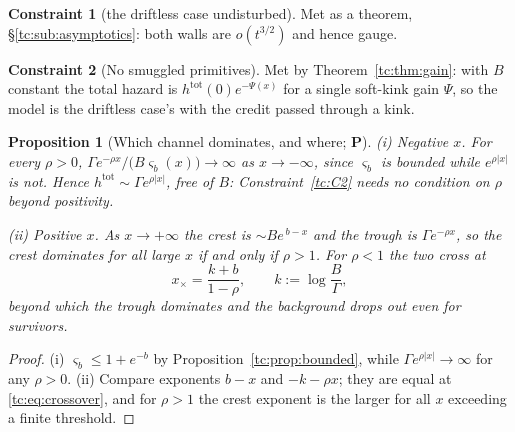 \documentclass[11pt]{article}
\numberwithin{equation}{section}
\theoremstyle{plain}
\newtheorem{proposition}[theorem]{Proposition}
\theoremstyle{definition}
\newtheorem{constraint}{Constraint}
\theoremstyle{remark}
\begin{document}
\begin{constraint}[the driftless case undisturbed]\label{tc:C3}
Met as a theorem, \S\ref{tc:sub:asymptotics}: both walls are
$o(t^{3/2})$ and hence gauge.
\end{constraint}

\begin{constraint}[No smuggled primitives]\label{tc:C4}
Met by Theorem~\ref{tc:thm:gain}: with $B$ constant the total hazard is
$h^{\mathrm{tot}}(0)e^{-\Psi(x)}$ for a single soft-kink gain $\Psi$, so
the model is the driftless case's with the credit passed through a kink.
\end{constraint}

\begin{proposition}[Which channel dominates, and where; \textbf{P}]
\label{tc:prop:dropout}
\emph{(i) Negative $x$.} For every $\rho>0$,
$\Gamma e^{-\rho x}/\bigl(B\varsigma_b(x)\bigr)\to\infty$ as
$x\to-\infty$, since $\varsigma_b$ is bounded while $e^{\rho|x|}$ is
not. Hence $h^{\mathrm{tot}}\sim\Gamma e^{\rho|x|}$, free of $B$:
Constraint~\ref{tc:C2} needs no condition on $\rho$ beyond positivity.

\emph{(ii) Positive $x$.} As $x\to+\infty$ the crest is
$\sim Be^{\,b-x}$ and the trough is $\Gamma e^{-\rho x}$, so the crest
dominates for all large $x$ if and only if $\rho>1$. For $\rho<1$ the
two cross at
\begin{equation}\label{tc:eq:crossover}
x_{\times}=\frac{k+b}{1-\rho},\qquad k:=\log\frac{B}{\Gamma},
\end{equation}
beyond which the trough dominates and the background drops out
\emph{even for survivors}.
\end{proposition}

\begin{proof}
(i) $\varsigma_b\le1+e^{-b}$ by Proposition~\ref{tc:prop:bounded}, while
$\Gamma e^{\rho|x|}\to\infty$ for any $\rho>0$. (ii) Compare exponents
$b-x$ and $-k-\rho x$; they are equal at \eqref{tc:eq:crossover}, and
for $\rho>1$ the crest exponent is the larger for all $x$ exceeding a
finite threshold.
\end{proof}
\end{document}
